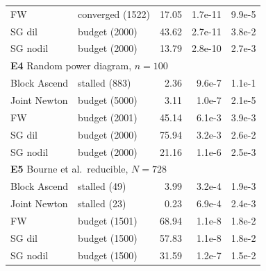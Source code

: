 \begin{table}[h]
\begin{tabular}{llrrr}
FW & converged {\scriptsize (1522)} & 17.05 & 1.7e-11 & 9.9e-5 \\
SG dil & budget {\scriptsize (2000)} & 43.62 & 2.7e-11 & 3.8e-2 \\
SG nodil & budget {\scriptsize (2000)} & 13.79 & 2.8e-10 & 2.7e-3 \\
\midrule
\multicolumn{5}{l}{\textbf{E4}\; Random power diagram, $n=100$}\\[1pt]
Block Ascend & stalled {\scriptsize (883)} & 2.36 & 9.6e-7 & 1.1e-1 \\
Joint Newton & budget {\scriptsize (5000)} & 3.11 & 1.0e-7 & 2.1e-5 \\
FW & budget {\scriptsize (2001)} & 45.14 & 6.1e-3 & 3.9e-3 \\
SG dil & budget {\scriptsize (2000)} & 75.94 & 3.2e-3 & 2.6e-2 \\
SG nodil & budget {\scriptsize (2000)} & 21.16 & 1.1e-6 & 2.5e-3 \\
\midrule
\multicolumn{5}{l}{\textbf{E5}\; Bourne et al.\ reducible, $N=728$}\\[1pt]
Block Ascend & stalled {\scriptsize (49)} & 3.99 & 3.2e-4 & 1.9e-3 \\
Joint Newton & stalled {\scriptsize (23)} & 0.23 & 6.9e-4 & 2.4e-3 \\
FW & budget {\scriptsize (1501)} & 68.94 & 1.1e-8 & 1.8e-2 \\
SG dil & budget {\scriptsize (1500)} & 57.83 & 1.1e-8 & 1.8e-2 \\
SG nodil & budget {\scriptsize (1500)} & 31.59 & 1.2e-7 & 1.5e-2 \\
\bottomrule
\end{tabular}
\end{table}



